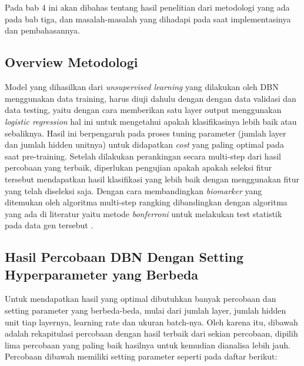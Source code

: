 \chapter{\babEmpat}

Pada bab 4 ini akan dibahas tentang hasil penelitian dari metodologi yang ada pada bab tiga, dan masalah-masalah yang dihadapi pada saat implementasinya dan pembahasannya.


\section{Overview Metodologi}
Model yang dihasilkan dari \textit{unsupervised learning} yang dilakukan oleh DBN menggunakan data training, harus diuji dahulu dengan dengan data validasi dan data testing, yaitu dengan cara memberikan satu layer output menggunakan \textit{logistic regression} hal ini untuk mengetahui apakah klasifikasinya lebih baik atau sebaliknya. Hasil ini berpengaruh pada proses tuning parameter (jumlah layer dan jumlah hidden unitnya) untuk didapatkan \textit{cost} yang paling optimal pada saat pre-training. Setelah dilakukan perankingan secara multi-step dari hasil percobaan yang terbaik, diperlukan pengujian apakah apakah seleksi fitur tersebut mendapatkan hasil klasifikasi yang lebih baik dengan menggunakan fitur yang telah diseleksi saja. Dengan cara membandingkan \textit{biomarker} yang ditemukan oleh algoritma multi-step rangking dibandingkan dengan algoritma yang ada di literatur yaitu metode \textit{bonferroni} untuk melakukan test statistik pada data gen tersebut \citep{hochberg1988sharper}. 


\section{Hasil Percobaan DBN Dengan Setting Hyperparameter yang Berbeda}
Untuk mendapatkan hasil yang optimal dibutuhkan banyak percobaan dan setting parameter yang berbeda-beda, mulai dari jumlah layer, jumlah hidden unit tiap layernya, learning rate dan ukuran batch-nya. Oleh karena itu, dibawah adalah rekapitulasi percobaan dengan hasil terbaik dari sekian percobaan, dipilih lima percobaan yang paling baik hasilnya untuk kemudian dianalisa lebih jauh. Percobaan dibawah memiliki setting parameter seperti pada daftar berikut:



